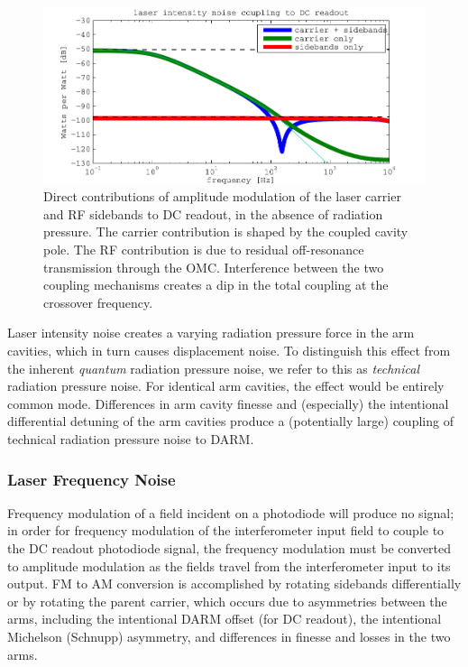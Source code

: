 \begin{figure}
\includegraphics[width=\columnwidth]{notes/figures/srcam_contributions.pdf}
\caption[Components of laser intensity noise contribution to DC readout]{\label{fig:laser-AM-contributions}Direct contributions of
  amplitude modulation of the laser carrier and RF sidebands to DC
  readout, in the absence of radiation pressure.  The carrier
  contribution is shaped by the coupled cavity pole.  The RF
  contribution is due to residual off-resonance transmission through
  the OMC.  Interference between the two coupling mechanisms creates a
  dip in the total coupling at the crossover frequency.}
\end{figure}

Laser intensity noise creates a varying radiation pressure force in the arm
cavities, which in turn causes displacement noise.  To distinguish this effect
from the inherent \emph{quantum} radiation pressure
noise\cite{Caves1980QuantumMechanical}, we refer to this as \emph{technical}
radiation pressure noise.  For identical arm cavities, the effect would be
entirely common mode.  Differences in arm cavity finesse and (especially) the
intentional differential detuning of the arm cavities produce a (potentially
large\cite{ChaibiOptomechanical}) coupling of technical radiation pressure noise
to DARM.

\subsubsection{Laser Frequency Noise}

Frequency modulation of a field incident on a photodiode will produce
no signal; in order for frequency modulation of the interferometer
input field to couple to the DC readout photodiode signal, the
frequency modulation must be converted to amplitude modulation as the
fields travel from the interferometer input to its output.  FM to AM
conversion is accomplished by rotating sidebands differentially or by
rotating the parent carrier, which occurs due to asymmetries between
the arms, including the intentional DARM offset (for DC readout), the
intentional Michelson (Schnupp) asymmetry, and differences in finesse
and losses in the two arms.

